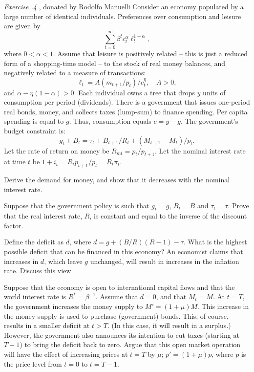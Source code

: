 \noindent
{\it Exercise \the\chapternum.4} , donated by Rodolfo Manuelli
\medskip\noindent
Consider an economy populated by a large number of identical individuals.
Preferences over consumption and leisure are given by
$$ \sum_{t=0}^\infty \beta^t c_t^\alpha \ell_t^{1-\alpha}, $$
where $0 < \alpha < 1$.  Assume that leisure is positively related --
this is just a reduced form of a shopping-time model -- to the
stock of real money balances, and negatively related to a measure
of transactions:
$$ \ell_t = A(m_{t+1}/p_t)/c_t^\eta ,\quad A > 0, $$
and $\alpha-\eta(1-\alpha) > 0$.  Each individual owns a tree that
drops $y$ units of consumption per period (dividends).  There is
a government that issues one-period real bonds, money, and collects
taxes (lump-sum) to finance spending.  Per capita spending is equal
to $g$.  Thus, consumption equals $c=y-g$.  The government's budget
constraint is:
$$ g_t + B_t = \tau_t + B_{t+1}/R_t + (M_{t+1}-M_t)/p_t.  $$
Let the rate of return on money be $R_{mt} = p_t/p_{t+1}$.  Let the
nominal interest rate at time $t$ be $1+i_t = R_t p_{t+1}/p_t = R_t
\pi_t$.
\medskip


  Derive the demand for money, and show that it decreases
with the nominal interest rate.
\medskip


  Suppose that the government policy is such that $g_t = g$, $B_t = B$
and $\tau_t = \tau$.  Prove that the real interest rate, $R$, is constant
and equal to the inverse of the discount factor.
\medskip


  Define the deficit as $d$, where $d = g + (B/R)(R-1)-\tau$.
What is the highest possible deficit that can be financed in this economy?
An economist claims that increases in $d$, which leave
$g$ unchanged, will result in increases in the inflation rate.
Discuss this view.
\medskip


  Suppose that the economy is open to international capital
flows and that the world interest rate is $R^* = \beta^{-1}$.  Assume
that $d = 0$, and that $M_t = M$.  At $t=T$, the government increases
the money supply to $M' = (1+\mu) M$.  This increase in the money supply
is used to purchase (government) bonds.  This, of course, results in
a smaller deficit at $t > T$.  (In this case, it will result in
a surplus.)  However, the government also announces its intention to
cut taxes (starting at $T+1$) to bring the deficit back to zero.  Argue
that this open market operation will have the effect of increasing prices
at $t=T$ by $\mu$; %
$p'=(1+\mu)p$, where $p$ is the price level from $t=0$ to $t=T -1$.
\medskip


